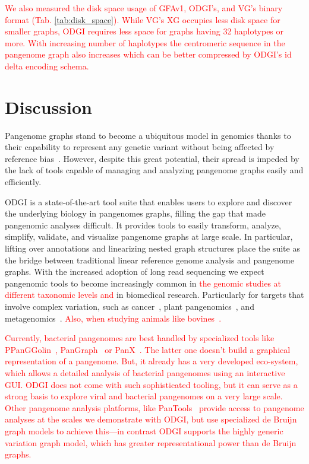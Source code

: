 \documentclass{bioinfo}
\newcommand{\REVIEWED}[1]{{\textcolor{Red}{#1}}}
\begin{document}
\REVIEWED{We also measured the disk space usage of GFAv1, ODGI's, and VG's binary format (Tab. \ref{tab:disk_space}). While VG's XG occupies less disk space for smaller graphs, ODGI requires less space for graphs having 32 haplotypes or more. With increasing number of haplotypes the centromeric sequence in the pangenome graph also increases which can be better compressed by ODGI's id delta encoding schema. }




%




\section{Discussion}
Pangenome graphs stand to become a ubiquitous model in genomics thanks to their capability to represent any genetic variant without being affected by reference bias~\citep{Eizenga_2020}.
However, despite this great potential, their spread is impeded by the lack of tools capable of managing and analyzing pangenome graphs easily and efficiently.

ODGI is a state-of-the-art tool suite that enables users to explore and discover the underlying biology in pangenomes graphs, filling the gap that made pangenomic analyses difficult.
It provides tools to easily transform, analyze, simplify, validate, and visualize pangenome graphs at large scale.
In particular, lifting over annotations and linearizing nested graph structures place the suite as the bridge between traditional linear reference genome analysis and pangenome graphs.
With the increased adoption of long read sequencing we expect pangenomic tools to become increasingly common in \REVIEWED{the genomic studies at different taxonomic levels and} in biomedical research.
Particularly for targets that involve complex variation, such as cancer\REVIEWED{~\citep{CompPan2016}}, plant pangenomics\REVIEWED{~\citep{Bayer2020, Liu2020, Qin2021, Li2022, Bayer2022}}, and metagenomics\REVIEWED{~\citep{Zhong2021}}. \REVIEWED{Also, when studying animals like bovines~\citep{Leonard2021, Talenti2022, BPC}.}

\REVIEWED{Currently, bacterial pangenomes are best handled by specialized tools like PPanGGolin~\citep{Gautreau2020}, PanGraph~\citep{Noll2022} or PanX~\citep{Wei2017}. The latter one doesn't build a graphical representation of  a pangenome. But, it already has a very developed eco-system, which allows a detailed analysis of bacterial pangenomes using an interactive GUI. ODGI does not come with such sophisticated tooling, but it can serve as a strong basis to explore viral and bacterial pangenomes on a very large scale.
Other pangenome analysis platforms, like PanTools~\citep{Sheikhizadeh_2016} provide access to pangenome analyses at the scales we demonstrate with ODGI, but use specialized de Bruijn graph models to achieve this---in contrast ODGI supports the highly generic variation graph model, which has greater representational power than de Bruijn graphs.}
\end{document}
